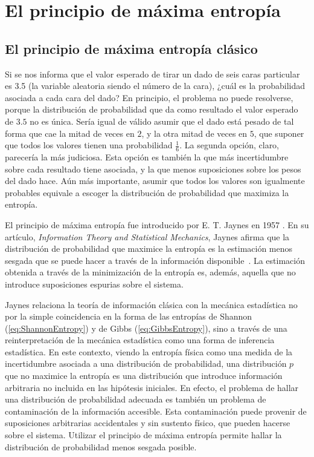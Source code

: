 \section{El principio de máxima entropía}
\label{sec:ch2_maxent}



\subsection{El principio de máxima entropía clásico}

Si se nos informa que el valor esperado de tirar un dado de seis caras particular es 3.5 (la variable aleatoria siendo el número de la cara), ¿cuál es la probabilidad asociada a cada cara del dado? En principio, el problema no puede resolverse, porque la distribución de probabilidad que da como resultado el valor esperado de $3.5$ no es única. Sería igual de válido asumir que el dado está pesado de tal forma que cae la mitad de veces en $2$, y la otra mitad de veces en $5$, que suponer que todos los valores tienen una probabilidad $\frac{1}{6}$. La segunda opción, claro, parecería la más judiciosa. Esta opción es también la que más incertidumbre sobre cada resultado tiene asociada, y la que menos suposiciones sobre los pesos del dado hace. Aún más importante, asumir que todos los valores son igualmente probables equivale a escoger la distribución de probabilidad que maximiza la entropía.


El principio de máxima entropía fue introducido por E. T. Jaynes en 1957 \cite{JaynesI}. En su artículo, \textit{Information Theory and Statistical Mechanics}, Jaynes afirma que la distribución de probabilidad que maximice la entropía es la estimación menos sesgada que se puede hacer a través de la información disponible~\cite{JaynesI}. La estimación obtenida a través de la minimización de la entropía es, además, aquella que no introduce suposiciones espurias sobre el sistema.

Jaynes relaciona la teoría de información clásica con la mecánica estadística no por la simple coincidencia en la forma de las entropías de Shannon (\ref{eq:ShannonEntropy}) y de Gibbs (\ref{eq:GibbsEntropy}), sino a través de una reinterpretación de la mecánica estadística como una forma de inferencia estadística. En este contexto, viendo la entropía física como una medida de la incertidumbre asociada a una distribución de probabilidad, una distribución $p$ que no maximice la entropía es una distribución que introduce información arbitraria no incluida en las hipótesis iniciales. En efecto, el problema de hallar una distribución de probabilidad adecuada es también un problema de contaminación de la información accesible. Esta contaminación puede provenir de suposiciones arbitrarias accidentales y sin sustento físico, que pueden hacerse sobre el sistema. Utilizar el principio de máxima entropía permite hallar la distribución de probabilidad menos sesgada posible.

